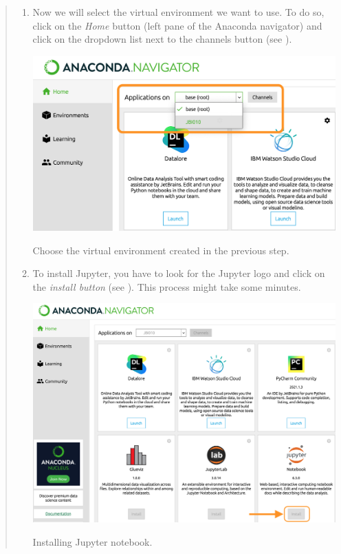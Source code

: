 \documentclass{latex-template/tufte-handout}
\begin{document}
\begin{quote}
\begin{enumerate}
\begin{marginfigure}[-20em]
			  \caption{Choose Python version.}
			  \label{fig:img3}
			\end{marginfigure}
		\item Now we will select the virtual environment we want to use. To do so, click on the \emph{Home} button (left pane of the Anaconda navigator) and click on the dropdown list next to the channels button (see ).
			\begin{marginfigure}[-7em]%
			  \includegraphics[width=\linewidth]{assets/04-choose-ve}
			  \caption{Choose the virtual environment created in the previous step.}
			  \label{fig:img4}
			\end{marginfigure}
		\item To install Jupyter, you have to  look for the Jupyter logo and click on the \emph{install button} (see ). This process might take some minutes.
			\begin{marginfigure}%
			  \includegraphics[width=1.2\linewidth]{assets/05-install-jupyter}
			  \caption{Installing Jupyter notebook.}
			  \label{fig:img5}
			\end{marginfigure}
	\end{enumerate}
\end{quote}
\end{document}
